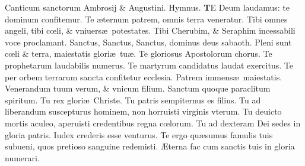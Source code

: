 \documentclass[a5paper,10pt]{book}
\def\ae{æ}
\def\AE{Æ}
\def\oe{œ}
\begin{document}
\begin{multicols*}{2}
\newline {} \color{red} Canticum sanctorum Ambrosij \& Augustini. \hypertarget{tedeum}{Hymnus.} \color{black}
\vspace{-1em}
\lettrine[lines=2]{\bfseries \color{red} T}{}E Deum laudamus: te dominum confitemur.
\newline \color{red} T\color{black}e \ae ternum patrem, omnis terra veneratur.
\newline \color{red} T\color{black}ibi omnes angeli, tibi c\oe li, \& vniuers\ae \ potestates.
\newline \color{red} T\color{black}ibi Cherubim, \& Seraphim incessabili voce proclamant.
\newline \color{red} S\color{black}anctus, Sanctus, Sanctus, dominus deus sabaoth.
\newline \color{red} P\color{black}leni sunt c\oe li \& terra, maiestatis glori\ae \ tu\ae .
\newline \color{red} T\color{black}e gloriosus Apostolorum chorus.
\newline \color{red} T\color{black}e prophetarum laudabilis numerus.
\newline \color{red} T\color{black}e martyrum candidatus laudat exercitus.
\newline \color{red} T\color{black}e per orbem terrarum sancta confitetur ecclesia.
\newline \color{red} P\color{black}atrem immens\ae \ maiestatis.
\newline \color{red} V\color{black}enerandum tuum verum, \& vnicum filium.
\newline \color{red} S\color{black}anctum quoque paraclitum spiritum.
\newline \color{red} T\color{black}u rex glori\ae \ Christe.
\newline \color{red} T\color{black}u patris sempiternus es filius.
\newline \color{red} T\color{black}u ad liberandum suscepturus hominem, non horruisti virginis vterum.
\newline \color{red} T\color{black}u deuicto mortis aculeo, aperuisti credentibus regna c\oe lorum.
\newline \color{red} T\color{black}u ad dexteram Dei sedes in gloria patris.
\newline \color{red} I\color{black}udex crederis esse venturus.
\newline \color{red} T\color{black}e ergo qu\ae sumus famulis tuis subueni, quos pretioso sanguine redemisti.
\newline \color{red} \AE \color{black}terna fac cum sanctis tuis in gloria numerari.

\end{multicols*}
\end{document}
